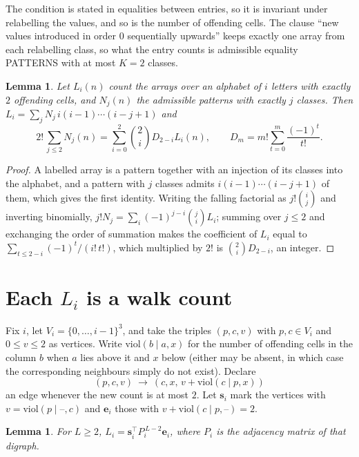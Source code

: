\documentclass[11pt,a4paper]{article}
\theoremstyle{plain}
\newtheorem{lemma}[theorem]{Lemma}
\theoremstyle{definition}
\begin{document}
The condition is stated in equalities between entries, so it is invariant under relabelling
the values, and so is the number of offending cells. The clause ``new values introduced in
order $0$ sequentially upwards'' keeps exactly one array from each relabelling class, so what
the entry counts is admissible equality PATTERNS with at most $K=2$ classes.

\begin{lemma}\label{lem:inv}
Let $L_i(n)$ count the arrays over an alphabet of $i$ letters with exactly $2$ offending
cells, and $N_j(n)$ the admissible patterns with exactly $j$ classes. Then
$L_i=\sum_j N_j\,i(i-1)\cdots(i-j+1)$ and
\[
2!\,\sum_{j\le2}N_j(n)=\sum_{i=0}^{2}\binom{2}{i}D_{2-i}L_i(n),
\qquad D_m=m!\sum_{t=0}^{m}\frac{(-1)^t}{t!} .
\]
\end{lemma}

\begin{proof}
A labelled array is a pattern together with an injection of its classes into the alphabet,
and a pattern with $j$ classes admits $i(i-1)\cdots(i-j+1)$ of them, which gives the first
identity. Writing the falling factorial as $j!\binom{i}{j}$ and inverting binomially,
$j!N_j=\sum_i(-1)^{j-i}\binom{j}{i}L_i$; summing over $j\le2$ and exchanging the
order of summation makes the coefficient of $L_i$ equal to
$\sum_{t\le2-i}(-1)^t/(i!\,t!)$, which multiplied by $2!$ is
$\binom{2}{i}D_{2-i}$, an integer.
\end{proof}

\section{Each $L_i$ is a walk count}

Fix $i$, let $V_i=\{0,\dots,i-1\}^{3}$, and take the triples $(p,c,v)$ with
$p,c\in V_i$ and $0\le v\le2$ as vertices. Write $\mathrm{viol}(b\mid a,x)$ for the number
of offending cells in the column $b$ when $a$ lies above it and $x$ below (either may be
absent, in which case the corresponding neighbours simply do not exist). Declare
\[
(p,c,v)\ \longrightarrow\ (c,x,\,v+\mathrm{viol}(c\mid p,x))
\]
an edge whenever the new count is at most $2$. Let $\mathbf{s}_i$ mark the vertices with
$v=\mathrm{viol}(p\mid\text{--},c)$ and $\mathbf{e}_i$ those with
$v+\mathrm{viol}(c\mid p,\text{--})=2$.

\begin{lemma}\label{lem:walk}
For $L\ge2$, $L_i=\mathbf{s}_i^{\!\top}P_i^{\,L-2}\mathbf{e}_i$, where $P_i$ is the
adjacency matrix of that digraph.
\end{lemma}
\end{document}
